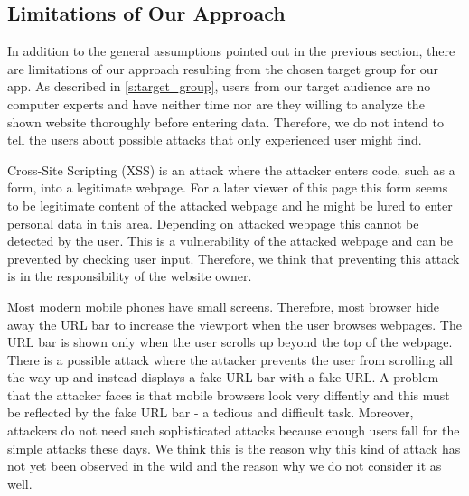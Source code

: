 \subsection{Limitations of Our Approach}
In addition to the general assumptions pointed out in the previous section, there are limitations of our approach resulting from the chosen target group for our app.
As described in \autoref{s:target_group}, users from our target audience are no computer experts and have neither time nor are they willing to analyze the shown website thoroughly before entering data.
Therefore, we do not intend to tell the users about possible attacks that only experienced user might find.
\begin{description}[leftmargin=0cm]
	\item[Cross-Site Scripting]
	Cross-Site Scripting (XSS) is an attack where the attacker enters code, such as a form, into a legitimate webpage.
	For a later viewer of this page this form seems to be legitimate content of the attacked webpage and he might be lured to enter personal data in this area. 
	Depending on attacked webpage this cannot be detected by the user.
	This is a vulnerability of the attacked webpage and can be prevented by checking user input.
	Therefore, we think that preventing this attack is in the responsibility of the website owner.
	\item[URL Hiding Techniques]
	Most modern mobile phones have small screens.
	Therefore, most browser hide away the URL bar to increase the viewport when the user browses webpages.
	The URL bar is shown only when the user scrolls up beyond the top of the webpage.
	There is a possible attack where the attacker prevents the user from scrolling all the way up and instead displays a fake URL bar with a fake URL.
	A problem that the attacker faces is that mobile browsers look very diffently and this must be reflected by the fake URL bar - a tedious and difficult task.
	Moreover, attackers do not need such sophisticated attacks because enough users fall for the simple attacks these days. 
	We think this is the reason why this kind of attack has not yet been observed in the wild and the reason why we do not consider it as well.
\end{description}

